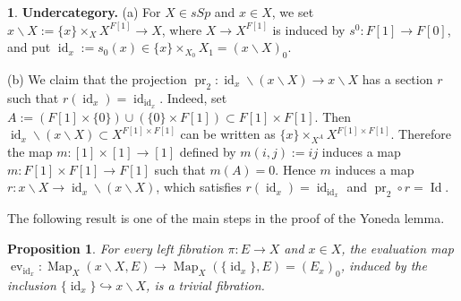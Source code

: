 \documentclass[12pt]{amsart}
\theoremstyle{plain}
\newtheorem{Prop}[Thm]{Proposition}
\theoremstyle{definition}
\newtheorem{Emp}[Thm]{}
\numberwithin{equation}{section}
\newcommand{\hra}{\hookrightarrow}
\newcommand{\bs}{\backslash}
\newcommand{\Map}{\operatorname{Map}}
\newcommand{\id}{\operatorname{id}}
\newcommand{\pr}{\operatorname{pr}}
\newcommand{\ev}{\operatorname{ev}}
\newcommand{\Id}{\operatorname{Id}}
\begin{document}
\begin{Emp} \label{E:section}
{\bf Undercategory.} (a) For $X\in sSp$ and $x\in X$, we set $x\bs
X:=\{x\}\times_X X^{F[1]}\to X$, where $X\to X^{F[1]}$ is induced by $s^0:F[1]\to F[0]$, 
and put $\id_x:=s_0(x)\in\{x\}\times_{X_0}X_1=(x\bs X)_0$.

(b) We claim that the projection $\pr_2:\id_x\bs(x\bs X)\to x\bs
X$ has a section $r$ such that $r(\id_x)=\id_{\id_x}$. Indeed, set
$A:=(F[1]\times\{0\})\cup(\{0\}\times F[1])\subset F[1]\times
F[1]$. Then $\id_x\bs (x\bs X)\subset X^{F[1]\times F[1]}$ can be
written as $\{x\}\times_{X^A} X^{F[1]\times F[1]}$. Therefore the
map $m:[1]\times[1]\to[1]$  defined by $m(i,j):=ij$ induces a
map $m:F[1]\times F[1]\to F[1]$ such that $m(A)=0$. Hence $m$
induces a map $r:x\bs X\to \id_x\bs (x\bs X)$, which 
satisfies $r(\id_x)=\id_{\id_x}$ and $\pr_2\circ r=\Id$.
\end{Emp}


The following result is one of the main steps in the proof of the 
Yoneda lemma.

\begin{Prop} \label{P:triv}
For every left fibration $\pi:E\to X$ and $x\in X$, the evaluation
map $\ev_{\id_x}:\Map_X(x\bs X, E)\to \Map_X(\{\id_x\},
E)=(E_x)_0$, induced by the inclusion $\{\id_x\}\hra x\bs X$, is a
trivial fibration.
\end{Prop}
\end{document}
